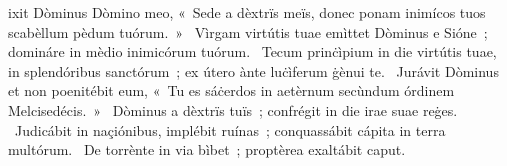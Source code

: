 { }
{%
ixit Dòminus Dòmino meo, «~Sede a dèxtrïs meïs, donec ponam inimícos tuos scabèllum pèdum tuórum.~»
~Vìrgam virtútis tuae emìttet Dòminus e Sióne~; domináre in mèdio inimicórum tuórum. 
~Tecum prinċìpium in die virtútis tuae, in splendóribus sanctórum~; ex útero ànte luċìferum ġènui te. 
~Jurávit Dòminus et non poenitébit eum, «~Tu es sáċerdos in aetèrnum secùndum órdinem Melcisedécis.~»
~Dòminus a dèxtrïs tuïs~; confrégit in die irae suae reġes. 
~Judicábit in naçiónibus, implébit ruínas~; conquassábit cápita in terra multórum. 
~De torrènte in via bìbet~; proptèrea exaltábit caput. 
}
